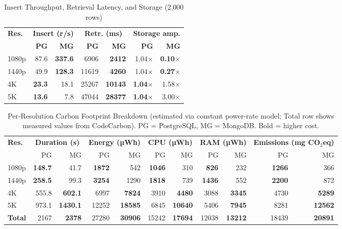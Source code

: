 \documentclass[conference]{IEEEtran}
\begin{document}
\begin{table}[htbp]
\centering
\renewcommand{\arraystretch}{1.1}
\caption{Insert Throughput, Retrieval Latency, and Storage (2,000 rows)}
\label{tab:performance_summary}
\begin{tabular}{l r r r r r r}
\hline
\textbf{Res.} & \multicolumn{2}{c}{\textbf{Insert (r/s)}} & \multicolumn{2}{c}{\textbf{Retr. (ms)}} & \multicolumn{2}{c}{\textbf{Storage amp.}} \\
 & \textbf{PG} & \textbf{MG} & \textbf{PG} & \textbf{MG} & \textbf{PG} & \textbf{MG} \\
\hline
1080p & 87.6  & \textbf{337.6} & 6906  & \textbf{2412}  & 1.04$\times$ & \textbf{0.10$\times$} \\
1440p & 49.9  & \textbf{128.3} & 11619 & \textbf{4260}  & 1.04$\times$ & \textbf{0.27$\times$} \\
4K    & \textbf{23.3} & 18.1  & 25267 & \textbf{10143} & \textbf{1.04$\times$} & 1.58$\times$ \\
5K    & \textbf{13.6} & 7.8   & 47044 & \textbf{28377} & \textbf{1.04$\times$} & 3.00$\times$ \\
\hline
\end{tabular}
\end{table}

\begin{table}[htbp]
\centering
\renewcommand{\arraystretch}{1.1}
\caption{Per-Resolution Carbon Footprint Breakdown (estimated via constant power-rate model; Total row shows measured values from CodeCarbon). PG = PostgreSQL, MG = MongoDB. Bold = higher cost.}
\label{tab:carbon_summary}
\begin{tabular}{l rr rr rr rr rr}
\hline
\textbf{Res.}
  & \multicolumn{2}{c}{\textbf{Duration (s)}}
  & \multicolumn{2}{c}{\textbf{Energy (µWh)}}
  & \multicolumn{2}{c}{\textbf{CPU (µWh)}}
  & \multicolumn{2}{c}{\textbf{RAM (µWh)}}
  & \multicolumn{2}{c}{\textbf{Emissions (mg CO$_2$eq)}} \\
  & PG & MG & PG & MG & PG & MG & PG & MG & PG & MG \\
\hline
1080p & \textbf{148.7} & 41.7  & \textbf{1872} & 542   & \textbf{1046} & 310   & \textbf{826}  & 232   & \textbf{1266} & 366   \\
1440p & \textbf{258.5} & 99.3  & \textbf{3254} & 1290  & \textbf{1818} & 739   & \textbf{1436} & 552   & \textbf{2200} & 872   \\
4K    & 555.8 & \textbf{602.1} & 6997  & \textbf{7824}  & 3910  & \textbf{4480}  & 3088  & \textbf{3345}  & 4730  & \textbf{5289}  \\
5K    & 973.1 & \textbf{1430.1}& 12252 & \textbf{18585} & 6845  & \textbf{10640} & 5406  & \textbf{7945}  & 8281  & \textbf{12562} \\
\hline
\textbf{Total} & 2167 & \textbf{2378} & 27280 & \textbf{30906} & 15242 & \textbf{17694} & 12038 & \textbf{13212} & 18439 & \textbf{20891} \\
\hline
\end{tabular}
\end{table}
\end{document}
